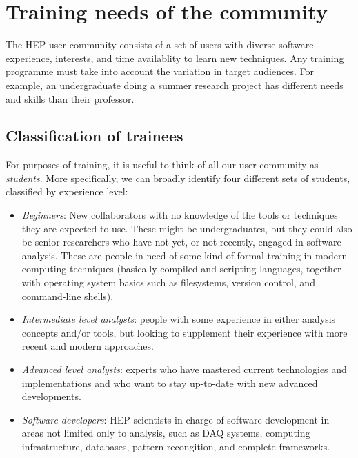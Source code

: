 \documentclass[12pt,a4paper]{article}
\begin{document}
\section{Training needs of the community}


The HEP user community consists of a set of users with diverse software
experience, interests, and time availablity to learn new techniques.  Any
training programme must take into account the variation in target audiences. For
example, an undergraduate doing a summer research project has different needs
and skills than their professor.

\subsection{Classification of trainees}

For purposes of training, it is useful to think of all our user community as
\emph{students}. More specifically, we can broadly identify four different sets
of students, classified by experience level:

\begin{itemize}
   \item \emph{Beginners}: New collaborators with no knowledge of the 
   tools or techniques they are expected to use. These might be undergraduates, 
   but they could also be senior researchers who have not yet, or not recently, 
   engaged in software analysis. These are people in need of some kind of formal 
   training in modern computing techniques (basically compiled and scripting 
   languages, together with operating system basics such as filesystems, version 
   control, and command-line shells).
   \item \emph{Intermediate level analysts}: people with some experience in 
   either analysis concepts and/or tools, but  looking to supplement their 
   experience with more recent and modern approaches. 
   \item \emph{Advanced level analysts}: experts who have mastered current 
   technologies and implementations and who want to stay up-to-date with 
   new advanced developments.
   \item \emph{Software developers}: HEP scientists in charge of software 
   development in areas not limited only to analysis, such as DAQ systems, 
   computing infrastructure, databases, pattern recongition, and complete 
   frameworks.
\end{itemize}
\end{document}
